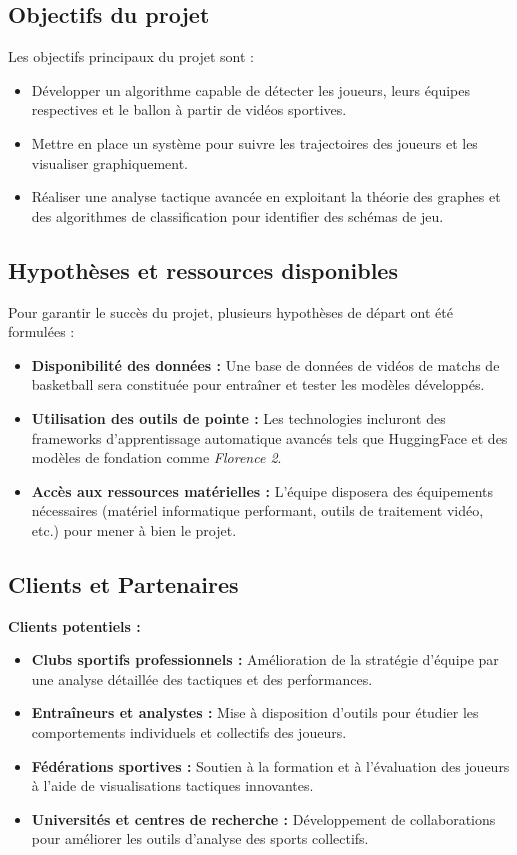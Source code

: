 \subsection{Objectifs du projet}
Les objectifs principaux du projet sont :
\begin{itemize}
    \item Développer un algorithme capable de détecter les joueurs, leurs équipes respectives et le ballon à partir de vidéos sportives.
    \item Mettre en place un système pour suivre les trajectoires des joueurs et les visualiser graphiquement.
    \item Réaliser une analyse tactique avancée en exploitant la théorie des graphes et des algorithmes de classification pour identifier des schémas de jeu.
\end{itemize}

\subsection{Hypothèses et ressources disponibles}
Pour garantir le succès du projet, plusieurs hypothèses de départ ont été formulées :
\begin{itemize}
    \item \textbf{Disponibilité des données :} Une base de données de vidéos de matchs de basketball sera constituée pour entraîner et tester les modèles développés.
    \item \textbf{Utilisation des outils de pointe :} Les technologies incluront des frameworks d’apprentissage automatique avancés tels que HuggingFace et des modèles de fondation comme \textit{Florence 2}.
    \item \textbf{Accès aux ressources matérielles :} L’équipe disposera des équipements nécessaires (matériel informatique performant, outils de traitement vidéo, etc.) pour mener à bien le projet.
\end{itemize}
\newpage

\subsection{Clients et Partenaires}
\textbf{Clients potentiels :}
\begin{itemize}
    \item \textbf{Clubs sportifs professionnels :} Amélioration de la stratégie d’équipe par une analyse détaillée des tactiques et des performances.
    \item \textbf{Entraîneurs et analystes :} Mise à disposition d’outils pour étudier les comportements individuels et collectifs des joueurs.
    \item \textbf{Fédérations sportives :} Soutien à la formation et à l’évaluation des joueurs à l’aide de visualisations tactiques innovantes.
    \item \textbf{Universités et centres de recherche :} Développement de collaborations pour améliorer les outils d’analyse des sports collectifs.
\end{itemize}

